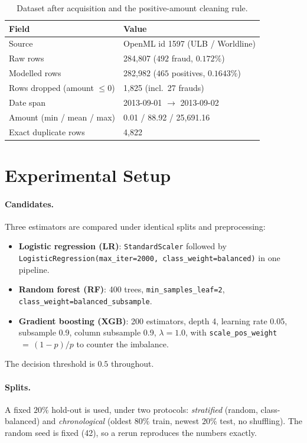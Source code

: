 \documentclass[conference]{IEEEtran}
\begin{document}
\begin{table}[t]
\centering
\caption{Dataset after acquisition and the positive-amount cleaning rule.}
\label{tab:data}
\begin{tabular}{@{}ll@{}}
\hline
\textbf{Field} & \textbf{Value} \\
\hline
Source & OpenML id 1597 (ULB / Worldline) \\
Raw rows & 284{,}807 ($492$ fraud, $0.172\%$) \\
Modelled rows & 282{,}982 ($465$ positives, $0.1643\%$) \\
Rows dropped (amount $\le 0$) & 1{,}825 (incl.\ 27 frauds) \\
Date span & 2013-09-01 $\to$ 2013-09-02 \\
Amount (min / mean / max) & 0.01 / 88.92 / 25{,}691.16 \\
Exact duplicate rows & 4{,}822 \\
\hline
\end{tabular}
\end{table}

\section{Experimental Setup}
\paragraph{Candidates.}
Three estimators are compared under identical splits and preprocessing:
\begin{itemize}
\item \textbf{Logistic regression (LR)}: \texttt{StandardScaler} followed by
\texttt{LogisticRegression(max\_iter=2000, class\_weight=balanced)} in one
pipeline.
\item \textbf{Random forest (RF)}: 400 trees, \texttt{min\_samples\_leaf=2},
\texttt{class\_weight=balanced\_subsample}.
\item \textbf{Gradient boosting (XGB)}: 200 estimators, depth 4, learning rate
0.05, subsample 0.9, column subsample 0.9, $\lambda=1.0$, with
\texttt{scale\_pos\_weight}$\,=\,(1-p)/p$ to counter the imbalance.
\end{itemize}
The decision threshold is $0.5$ throughout.

\paragraph{Splits.}
A fixed $20\%$ hold-out is used, under two protocols:
\emph{stratified} (random, class-balanced) and \emph{chronological} (oldest
$80\%$ train, newest $20\%$ test, no shuffling). The random seed is fixed
(42), so a rerun reproduces the numbers exactly.
\end{document}
